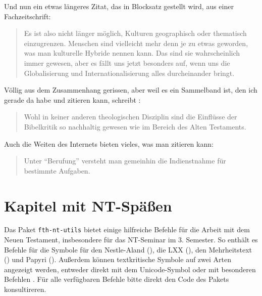 \documentclass{scrreport}
\begin{document}
Und nun ein etwas längeres Zitat, das in Blocksatz gestellt wird, aus einer Fachzeitschrift: \blockcquote[][]{dahl}{Es ist also nicht länger möglich, Kulturen geographisch oder thematisch einzugrenzen. Menschen sind vielleicht mehr denn je zu etwas geworden, was man kulturelle Hybride nennen kann. Das sind sie wahrscheinlich immer gewesen, aber es fällt uns jetzt besonders auf, wenn uns die Globalisierung und Internationalisierung alles durch\-einander bringt.}

Völlig aus dem Zusammenhang gerissen, aber weil es ein Sammelband ist, den ich gerade da habe und zitieren kann, schreibt \citeauthor*{hilbrands}: \blockcquote[][49]{hilbrands}{Wohl in keiner anderen theologischen Disziplin sind die Einflüsse der Bibelkritik so nachhaltig gewesen wie im Bereich des Alten Testaments.}

Auch die Weiten des Internets bieten vieles, was man zitieren kann: \blockcquote[][]{strecker}{Unter \enquote{Berufung} versteht man gemeinhin die \textelp{} Indienstnahme für bestimmte Aufgaben.}

\chapter{Kapitel mit NT-Späßen}
Das Paket \texttt{fth-nt-utils} bietet einige hilfreiche Befehle für die Arbeit mit dem Neuen Testament, insbesondere für das NT-Seminar im 3. Semester. So enthält es Befehle für die Symbole für den Nestle-Aland (\na), die LXX (\lxx), den Mehrheitstext (\majoritytext) und Papyri (). Außerdem können textkritische Symbole auf zwei Arten angezeigt werden, entweder direkt mit dem Unicode-Symbol  oder mit besonderen Befehlen \tcOmissionStart{} \tcOmissionEnd. Für alle verfügbaren Befehle bitte direkt den Code des Pakets konsultireren.
\end{document}
